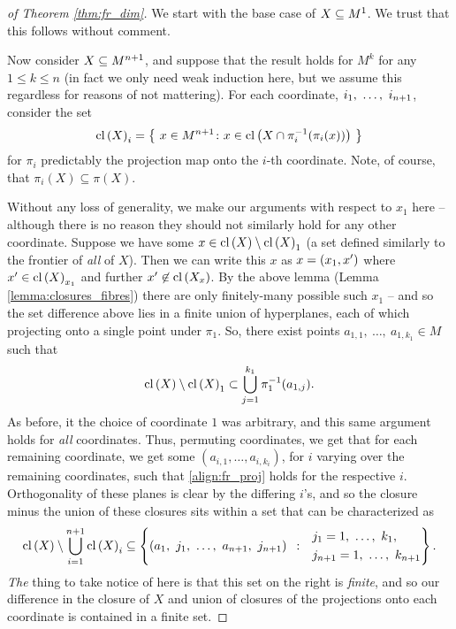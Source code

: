 \begin{proof}[of Theorem \ref{thm:fr_dim}]
  We start with the base case of $\XMn[X]{1}$. We trust that this follows without comment.

  Now consider $\XMn[X]{n + 1}$, and suppose that the result holds for $M^k$ for any $1 \leq k \leq n$ (in fact we only need weak induction here, but we assume this regardless for reasons of not mattering). For each coordinate, $\vonevm{i}{n+1}$, consider the set
    \begin{align*}
      \cl{X}_i = \left\{ \ x \in M^{n + 1} \colon x \in \cl{X \cap \inv{\pi_i}(\pi_i(x)) } \ \right\}
    \end{align*}
  for $\pi_i$ predictably the projection map onto the $i$-th coordinate. Note, of course, that $\pi_i(X) \subseteq \pi(X)$.

  Without any loss of generality, we make our arguments with respect to $x_1$ here -- although there is no reason they should not similarly hold for any other coordinate. Suppose we have some $x \in \cl{X} \setminus \cl{X}_1$ (a set defined similarly to the frontier of \emph{all} of $X$). Then we can write this $x$ as $x = (x_1, \pri{x})$ where $\pri{x} \in \cl{X}_{x_1}$ and further $\pri{x} \not\in \cl{X_x}$. By the above lemma (Lemma \ref{lemma:closures_fibres}) there are only finitely-many possible such $x_1$ -- and so the set difference above lies in a finite union of hyperplanes, each of which projecting onto a single point under $\pi_1$. So, there exist points $a_{1,1}, \ \hdots, \ a_{1, k_1} \in M$ such that
    \begin{align}
      \cl{X} \setminus \cl{X}_1 \subset \bigcup_{j=1}^{k_1} \inv{\pi_1}(a_{1, j}).
      \label{align:fr_proj}
    \end{align}
  As before, it the choice of coordinate $1$ was arbitrary, and this same argument holds for \emph{all} coordinates. Thus, permuting coordinates, we get that for each remaining coordinate, we get some $\left(  a_{i, 1}, \hdots, a_{i, k_i} \right)$, for $i$ varying over the remaining coordinates, such that \ref{align:fr_proj} holds for the respective $i$. Orthogonality of these planes is clear by the differing $i$'s, and so the closure minus the union of these closures sits within a set that can be characterized as
    \begin{align*}
      \cl{X} \setminus \bigcup_{i=1}^{n+1} \cl{X}_i \subseteq \left\{ (a_{1},\ j_{1},\ \hdots,\ a_{n+1},\ j_{n+1}) \ \ \colon \ \ \begin{aligned} & j_1 = 1,\ \hdots,\ k_1, \\ & j_{n+1} = 1,\ \hdots,\ k_{n+1} \end{aligned} \right\}.
    \end{align*}
    \emph{The} thing to take notice of here is that this set on the right is \emph{finite}, and so our difference in the closure of $X$ and union of closures of the projections onto each coordinate is contained in a finite set.


\end{proof}
